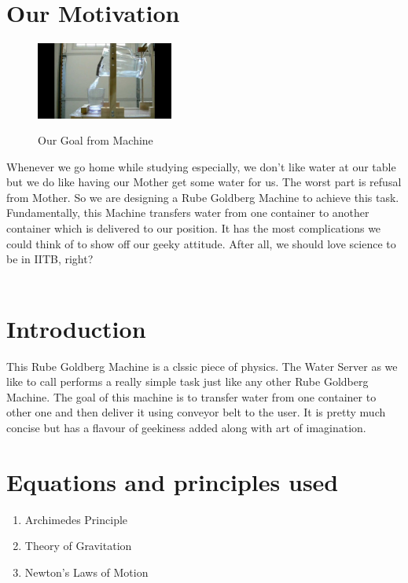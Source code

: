 \documentclass[a4paper,10pt]{article}
\begin{document}
\section*{Our Motivation}
\begin{figure}

\begin{center}
\vspace{-20pt}
\includegraphics[width=0.4\textwidth]{img2}

\caption{Our Goal from Machine}\cite{Youtube}
\end{center}
\end{figure}
\hfill \break Whenever we go home while studying especially, we don't like water at our table but we do like having our Mother get some water for us. The worst part is refusal from Mother. So we are designing a Rube Goldberg Machine to achieve this task. Fundamentally, this Machine transfers water from one container to another container which is delivered to our position. It has the most complications we could think of to show off our geeky attitude. After all, we should love science to be in IITB, right?
\\ \\

\section*{Introduction}
This Rube Goldberg Machine is a clssic piece of physics. The Water Server as we like to call performs a really simple task just like any other Rube Goldberg Machine. The goal of this machine is to transfer water from one container to other one and then deliver it using conveyor belt to the user. It is pretty much concise but has a flavour of geekiness added along with art of imagination.
\section*{Equations and principles used}

	\begin{enumerate}
	\item 	Archimedes Principle
	\item 	Theory of Gravitation
	\item   Newton's Laws of Motion
	\end{enumerate}
\end{document}
